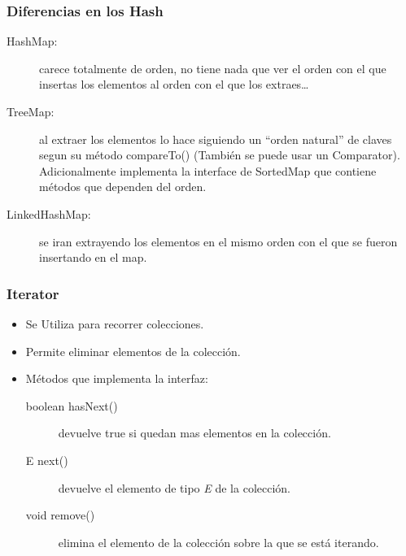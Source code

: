 \documentclass{beamer}
\begin{document}
\begin{frame}
\frametitle{Diferencias en los Hash}
\begin{description}
\item[HashMap:] carece totalmente de orden, no tiene nada que ver el orden con el que insertas los elementos al orden con el que los extraes…
\item[TreeMap:] al extraer los elementos lo hace siguiendo un “orden natural” de claves segun su método compareTo() (También se puede usar un Comparator). Adicionalmente implementa la interface de SortedMap que contiene métodos que dependen del orden.
\item[LinkedHashMap:] se iran extrayendo los elementos en el mismo orden con el que se fueron insertando en el map.
\end{description}
\end{frame}

\begin{frame}
\frametitle{Iterator}
\begin{itemize}[<+->]
\item Se Utiliza para recorrer colecciones.
\item Permite eliminar elementos de la colección.
\item Métodos que implementa la interfaz:
\begin{description}
\item[boolean hasNext()] devuelve true si quedan mas elementos en la colección.
\item[E next()] devuelve el elemento de tipo \emph{E} de la colección.
\item[void remove()] elimina el elemento de la colección sobre la que se está iterando.
\end{description}
\end{itemize}
\end{frame}
\end{document}
